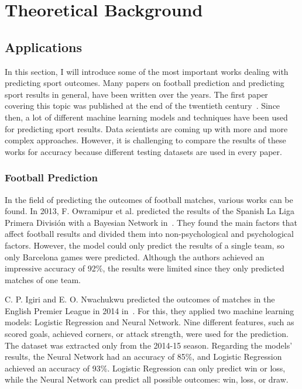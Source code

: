\documentclass[thesis=M,english]{FITthesis}[2019/12/23]
\begin{document}
\chapter{Theoretical Background}
\label{ter_back}
\section{Applications}
\label{applications}
In this section, I will introduce some of the most important works dealing with predicting sport outcomes. Many papers on football prediction and predicting sport results in general, have been written over the years. The first paper covering this topic was published at the end of the twentieth century~\cite{NFL_first_study}. Since then, a lot of different machine learning models and techniques have been used for predicting sport results. Data scientists are coming up with more and more complex approaches. However, it is challenging to compare the results of these works for accuracy because different testing datasets are used in every paper.

\subsection{Football Prediction}
In the field of predicting the outcomes of football matches, various works can be found. In 2013, F. Owramipur et al. predicted the results of the Spanish La Liga Primera División with a Bayesian Network in~\cite{Football_Bayesian_network}. They found the main factors that affect football results and divided them into non-psychological and psychological factors. However, the model could only predict the results of a single team, so only Barcelona games were predicted. Although the authors achieved an impressive accuracy of 92\%, the results were limited since they only predicted matches of one team.

C. P. Igiri and E. O. Nwachukwu predicted the outcomes of matches in the English Premier League in 2014 in~\cite{BPL_ANN_logistic_regression}. For this, they applied two machine learning models: Logistic Regression and Neural Network. Nine different features, such as scored goals, achieved corners, or attack strength, were used for the prediction. The dataset was extracted only from the 2014-15 season. Regarding the models' results, the Neural Network had an accuracy of 85\%, and Logistic Regression achieved an accuracy of 93\%. Logistic Regression can only predict win or loss, while the Neural Network can predict all possible outcomes: win, loss, or draw.
\end{document}

